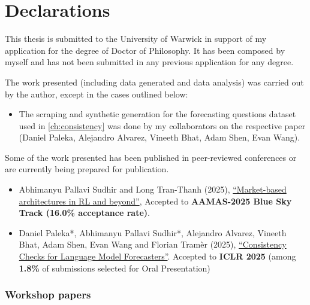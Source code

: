 \chapter{Declarations}

This thesis is submitted to the University of Warwick in support of my application for the degree of Doctor of Philosophy. It has been composed by myself and has not been submitted in any previous application for any degree.

The work presented (including data generated and data analysis) was carried out by the author, except in the cases outlined below: 

\begin{itemize}
      \item The scraping and synthetic generation for the forecasting questions dataset used in \cref{ch:consistency} was done by my collaborators on the respective paper (Daniel Paleka, Alejandro Alvarez, Vineeth Bhat, Adam Shen, Evan Wang). 
\end{itemize}

Some of the work presented has been published in peer-reviewed conferences or are currently being prepared for publication.


\begin{itemize}

      \item Abhimanyu Pallavi Sudhir and Long Tran-Thanh (2025), \href{https://arxiv.org/abs/2503.05828}{``Market-based architectures in RL and beyond''}, Accepted to \textbf{AAMAS-2025 Blue Sky Track (16.0\% acceptance rate)}.

      \item Daniel Paleka*, Abhimanyu Pallavi Sudhir*, Alejandro Alvarez, Vineeth Bhat, Adam Shen, Evan Wang and Florian Tram\`er (2025), \href{https://arxiv.org/abs/2412.18544}{``Consistency Checks for Language Model Forecasters''}. Accepted to \textbf{ICLR 2025} (among \textbf{1.8\%} of submissions selected for Oral Presentation)
\end{itemize}

\subsection*{Workshop papers}

